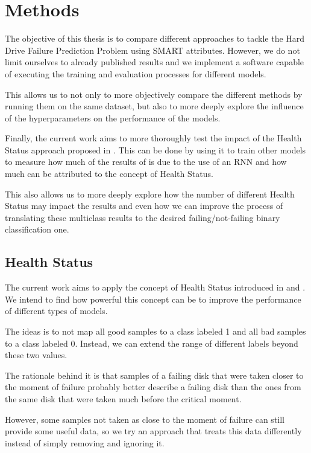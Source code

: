 \chapter{Methods}\label{chap:methods}

The objective of this thesis is to compare different approaches to tackle the Hard Drive Failure Prediction Problem using SMART attributes.
However, we do not limit ourselves to already published results and we implement a software capable of executing the training and evaluation processes for different models.

This allows us to not only to more objectively compare the different methods by running them on the same dataset, but also to more deeply explore the influence of the hyperparameters on the performance of the models.

Finally, the current work aims to more thoroughly test the impact of the Health Status approach proposed in \cite{Xu16}.
This can be done by using it to train other models to measure how much of the results of \cite{Xu16} is due to the use of an RNN and how much can be attributed to the concept of Health Status.

This also allows us to more deeply explore how the number of different Health Status may impact the results and even how we can improve the process of translating these multiclass results to the desired failing/not-failing binary classification one.

\section{Health Status}\label{sec:health_status}

The current work aims to apply the concept of Health Status introduced in \cite{Xu16} and \cite{Li14}.
We intend to find how powerful this concept can be to improve the performance of different types of models.

The ideas is to not map all good samples to a class labeled 1 and all bad samples to a class labeled 0.
Instead, we can extend the range of different labels beyond these two values.

The rationale behind it is that samples of a failing disk that were taken closer to the moment of failure probably better describe a failing disk than the ones from the same disk that were taken much before the critical moment.

However, some samples not taken as close to the moment of failure can still provide some useful data, so we try an approach that treats this data differently instead of simply removing and ignoring it.

